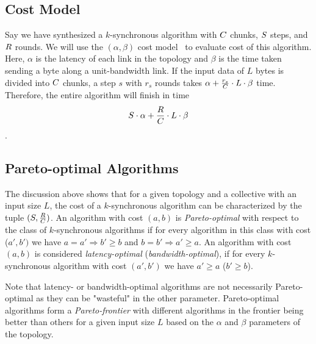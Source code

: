 \subsection{Cost Model}
\label{sec:costmodel}
Say we have synthesized a $k$-synchronous algorithm with $C$
chunks, $S$ steps, and $R$ rounds. We will use the
$(\alpha, \beta)$ cost model~\cite{hockney1994communication} to
evaluate cost of this algorithm. Here, $\alpha$ is the latency of each
link in the topology and $\beta$ is the time taken sending a byte
along a unit-bandwidth link. If the input data of $L$ bytes is divided
into $C$ chunks, a step $s$ with $r_s$ rounds takes $\alpha +
\frac{r_s}{C}\cdot L \cdot \beta$ time. Therefore, the entire
algorithm will finish in time
$$ S \cdot \alpha + \frac{R}{C} \cdot L \cdot \beta $$.

\subsection{Pareto-optimal Algorithms}
\label{sec:pareto:optimal}
The discussion above shows that for a given topology and a collective
with an input size $L$, the cost of a $k$-synchronous algorithm can be
characterized by the tuple $(S, \frac{R}{C})$. An
algorithm with cost $(a,b)$ is {\em Pareto-optimal} with respect to
the class of $k$-synchronous algorithms if for every algorithm in this
class with cost  ($a', b')$ we have $a = a' \Rightarrow b' \geq b$ and
$b = b' \Rightarrow a' \geq a$. An algorithm with cost $(a,b)$ is
considered {\em latency-optimal} ({\em bandwidth-optimal}), if for
every $k$-synchronous algorithm with cost $(a',b')$ we have $a' \geq
a$ ($b' \geq b$).

Note that latency- or bandwidth-optimal algorithms are not necessarily
Pareto-optimal as they can be "wasteful" in the other parameter.
Pareto-optimal algorithms form a {\em Pareto-frontier} with different
algorithms in the frontier being better than others for a given input
size $L$ based on the $\alpha$ and $\beta$ parameters of the topology.

